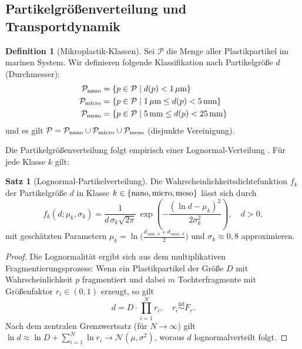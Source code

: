 ﻿\documentclass[12pt,a4paper]{article}
\theoremstyle{definition}
\newtheorem{definition}{Definition}[section]
\newtheorem{theorem}{Satz}[section]
\theoremstyle{remark}
\begin{document}
\subsection{Partikelgrö\ss{}enverteilung und Transportdynamik}

\begin{definition}[Mikroplastik-Klassen]
Sei $\mathcal{P}$ die Menge aller Plastikpartikel im marinen System.
Wir definieren folgende Klassifikation nach Partikelgr\"o\ss{}e $d$ (Durchmesser):
\begin{align}
  \mathcal{P}_{\rm nano}  &= \{ p \in \mathcal{P} \mid d(p) < 1\,\mu\text{m} \} \\
  \mathcal{P}_{\rm micro} &= \{ p \in \mathcal{P} \mid 1\,\mu\text{m} \leq d(p) < 5\,\text{mm} \} \\
  \mathcal{P}_{\rm meso}  &= \{ p \in \mathcal{P} \mid 5\,\text{mm} \leq d(p) < 25\,\text{mm} \}
\end{align}
und es gilt $\mathcal{P} = \mathcal{P}_{\rm nano} \cup \mathcal{P}_{\rm micro}
\cup \mathcal{P}_{\rm meso}$ (disjunkte Vereinigung).
\end{definition}

Die Partikelgr\"o\ss{}enverteilung folgt empirisch einer Lognormal-Verteilung
\cite{cozar2014plastic, poulain2019small}. F\"ur jede Klasse $k$ gilt:

\begin{theorem}[Lognormal-Partikelverteilung]
Die Wahrscheinlichkeitsdichtefunktion $f_k$ der Partikelgr\"o\ss{}e $d$ in
Klasse $k \in \{{\rm nano, micro, meso}\}$ l\"asst sich durch
\begin{equation}
  f_k(d; \mu_k, \sigma_k) = \frac{1}{d\,\sigma_k\sqrt{2\pi}}\,
  \exp\!\left(-\frac{(\ln d - \mu_k)^2}{2\sigma_k^2}\right), \quad d > 0,
  \label{eq:lognormal}
\end{equation}
mit gesch\"atzten Parametern $\mu_k = \ln\bigl(\frac{d_{\min,k} + d_{\max,k}}{2}\bigr)$
und $\sigma_k \approx 0{,}8$ approximieren.
\end{theorem}

\begin{proof}
Die Lognormalit\"at ergibt sich aus dem multiplikativen Fragmentierungsprozess:
Wenn ein Plastikpartikel der Gr\"o\ss{}e $D$ mit Wahrscheinlichkeit $p$ fragmentiert
und dabei $m$ Tochterfragmente mit Gr\"o\ss{}enfaktor $r_i \in (0,1)$ erzeugt, so gilt
\begin{equation}
  d = D \cdot \prod_{i=1}^{N} r_i, \quad r_i \overset{\text{iid}}{\sim} F_r.
\end{equation}
Nach dem zentralen Grenzwertsatz (f\"ur $N \to \infty$) gilt
$\ln d \approx \ln D + \sum_{i=1}^{N} \ln r_i \to \mathcal{N}(\mu, \sigma^2)$,
woraus $d$ lognormalverteilt folgt.
\end{proof}
\end{document}
